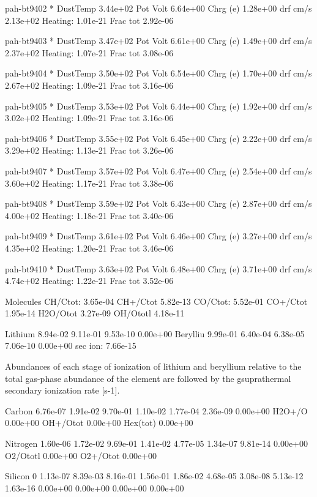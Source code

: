 { pah-bt9402 *  DustTemp 3.44e+02 Pot Volt 6.64e+00 Chrg (e) 1.28e+00 drf
cm/s 2.13e+02 Heating: 1.01e-21 Frac tot 2.92e-06

 pah-bt9403 *  DustTemp 3.47e+02 Pot Volt 6.61e+00 Chrg (e) 1.49e+00 drf
cm/s 2.37e+02 Heating: 1.07e-21 Frac tot 3.08e-06

 pah-bt9404 *  DustTemp 3.50e+02 Pot Volt 6.54e+00 Chrg (e) 1.70e+00 drf
cm/s 2.67e+02 Heating: 1.09e-21 Frac tot 3.16e-06

 pah-bt9405 *  DustTemp 3.53e+02 Pot Volt 6.44e+00 Chrg (e) 1.92e+00 drf
cm/s 3.02e+02 Heating: 1.09e-21 Frac tot 3.16e-06

 pah-bt9406 *  DustTemp 3.55e+02 Pot Volt 6.45e+00 Chrg (e) 2.22e+00 drf
cm/s 3.29e+02 Heating: 1.13e-21 Frac tot 3.26e-06

 pah-bt9407 *  DustTemp 3.57e+02 Pot Volt 6.47e+00 Chrg (e) 2.54e+00 drf
cm/s 3.60e+02 Heating: 1.17e-21 Frac tot 3.38e-06

 pah-bt9408 *  DustTemp 3.59e+02 Pot Volt 6.43e+00 Chrg (e) 2.87e+00 drf
cm/s 4.00e+02 Heating: 1.18e-21 Frac tot 3.40e-06

 pah-bt9409 *  DustTemp 3.61e+02 Pot Volt 6.46e+00 Chrg (e) 3.27e+00 drf
cm/s 4.35e+02 Heating: 1.20e-21 Frac tot 3.46e-06

 pah-bt9410 *  DustTemp 3.63e+02 Pot Volt 6.48e+00 Chrg (e) 3.71e+00 drf
cm/s 4.74e+02 Heating: 1.22e-21 Frac tot 3.52e-06



Molecules     CH/Ctot: 3.65e-04 CH+/Ctot 5.82e-13 CO/Ctot: 5.52e-01 CO+/Ctot
1.95e-14 H2O/Otot 3.27e-09 OH/Ototl 4.18e-11



Lithium       8.94e-02 9.11e-01 9.53e-10 0.00e+00 Berylliu 9.99e-01 6.40e-04
6.38e-05 7.06e-10 0.00e+00 sec ion: 7.66e-15

   Abundances of each stage of ionization of lithium and beryllium relative
to the total gas-phase abundance of the element are followed by the
gsuprathermal secondary ionization rate [s-1].

Carbon        6.76e-07 1.91e-02 9.70e-01 1.10e-02 1.77e-04 2.36e-09 0.00e+00
H2O+/O   0.00e+00 OH+/Otot 0.00e+00 Hex(tot) 0.00e+00

 
Nitrogen      1.60e-06 1.72e-02 9.69e-01 1.41e-02 4.77e-05 1.34e-07 9.81e-14
0.00e+00 O2/Ototl 0.00e+00 O2+/Otot 0.00e+00

 
 Silicon    0  1.13e-07 8.39e-03 8.16e-01 1.56e-01 1.86e-02 4.68e-05 3.08e-08
5.13e-12 1.63e-16 0.00e+00 0.00e+00 0.00e+00 0.00e+00

}
